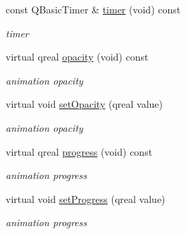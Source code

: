 \begin{DoxyCompactItemize}
const Q\+Basic\+Timer \& \hyperlink{class_menu_bar_data_v2_a9eab957f8db8f1422cc6d90bfc22874e}{timer} (void) const
\begin{DoxyCompactList}\small\item\em timer \end{DoxyCompactList}\item 
\mbox{\label{class_menu_bar_data_v2_ad290fd9571adfa2106ffa02637391e50}} 
virtual qreal \hyperlink{class_menu_bar_data_v2_ad290fd9571adfa2106ffa02637391e50}{opacity} (void) const
\begin{DoxyCompactList}\small\item\em animation opacity \end{DoxyCompactList}\item 
\mbox{\label{class_menu_bar_data_v2_a275ca04b703cadb43be95f7da43342c6}} 
virtual void \hyperlink{class_menu_bar_data_v2_a275ca04b703cadb43be95f7da43342c6}{set\+Opacity} (qreal value)
\begin{DoxyCompactList}\small\item\em animation opacity \end{DoxyCompactList}\item 
\mbox{\label{class_menu_bar_data_v2_a4ea49975c66f4bfa8b30973421bc82e6}} 
virtual qreal \hyperlink{class_menu_bar_data_v2_a4ea49975c66f4bfa8b30973421bc82e6}{progress} (void) const
\begin{DoxyCompactList}\small\item\em animation progress \end{DoxyCompactList}\item 
\mbox{\label{class_menu_bar_data_v2_ae1e1b87d9e124e15995b03f7cdf4c5b0}} 
virtual void \hyperlink{class_menu_bar_data_v2_ae1e1b87d9e124e15995b03f7cdf4c5b0}{set\+Progress} (qreal value)
\begin{DoxyCompactList}\small\item\em animation progress \end{DoxyCompactList}\end{DoxyCompactItemize}
